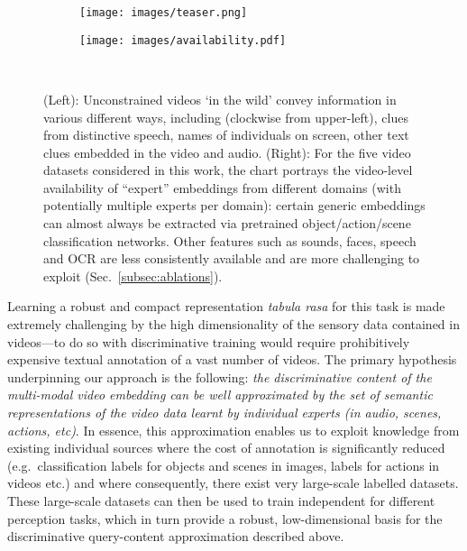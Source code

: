 \documentclass{bmvc2k}
\begin{document}
\begin{figure}
    \centering
    \begin{minipage}{0.38\linewidth}
        \vspace{-1.2cm}
        \hspace{0.2cm}
        \begin{subfigure}{}
        \texttt{[image: images/teaser.png]}
        \end{subfigure}
    \end{minipage}\begin{minipage}{0.6\linewidth}
        \hspace{0.2cm}
        \begin{subfigure}{}
            \texttt{[image: images/availability.pdf]}\\
        \end{subfigure} \\
    \end{minipage}
    \vspace{-0.8cm}
\caption{(Left): Unconstrained videos `in the wild' convey information in various different ways, including (clockwise from upper-left), clues from distinctive speech, names of individuals on screen, other text clues embedded in the video and audio. (Right): For the five video datasets considered in this work, the chart portrays the video-level availability of ``expert'' embeddings from different domains (with potentially multiple experts per domain): certain generic embeddings can almost always be extracted via pretrained object/action/scene classification networks. Other features such as sounds, faces, speech and OCR are less consistently available and are more challenging to exploit (Sec.~\ref{subsec:ablations}). \label{fig:teaser}}   
\vspace{-1em}
\end{figure}

Learning a robust and compact representation \textit{tabula rasa} for
this task is made extremely challenging by the high dimensionality of
the sensory data contained in videos---to do so with discriminative
training would require prohibitively expensive textual annotation of a
vast number of videos.  The primary hypothesis underpinning our
approach is the following: \textit{the discriminative content of the multi-modal video embedding
can be well approximated by the set of semantic representations of the video data learnt by individual experts (in audio, 
scenes, actions, etc)}. In essence, this approximation
enables us to exploit knowledge from
existing individual sources where the cost of annotation is significantly reduced
(e.g.\  classification labels for objects and scenes in images, labels for actions in
videos etc.) and where consequently, there exist very large-scale labelled datasets.
These large-scale datasets can then be
used to train independent  for different 
perception tasks, which in turn provide a robust,
low-dimensional basis for the discriminative query-content
approximation described above. 
\end{document}

